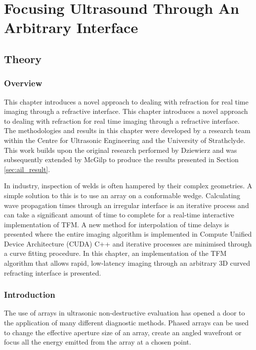 

\chapter{Focusing Ultrasound Through An Arbitrary Interface}\label{chap:cuetfm}

\graphicspath{{cueTFM/Images/}}

\section{Theory}
\subsection{Overview}
This chapter introduces a novel approach to dealing with refraction for real time imaging through a refractive interface. This chapter introduces a novel approach to dealing with refraction for real time imaging through a refractive interface. The methodologies and results in this chapter were developed by a research team within the Centre for Ultrasonic Engineering and the University of Strathclyde. This work builds upon the original research performed by Dziewierz\cite{dziewierz_2d_2015} and was subsequently extended by McGilp\cite{mcgilp_adaptation_2016} to produce the results presented in Section \ref{sec:ail_result}.

In industry, inspection of welds is often hampered by their complex geometries. A simple solution to this is to use an array on a conformable wedge\cite{russell_development_2010}. Calculating wave propagation times through an irregular interface is an iterative process and can take a significant amount of time to complete for a real-time interactive implementation of TFM. A new method for interpolation of time delays is presented where the entire imaging algorithm is implemented in Compute Unified Device Architecture (CUDA) C++ and iterative processes are minimised through a curve fitting procedure. In this chapter, an implementation of the TFM algorithm that allows rapid, low-latency imaging through an arbitrary 3D curved refracting interface is presented. 

\subsection{Introduction}

The use of arrays in ultrasonic non-destructive evaluation has opened a door to the application of many different diagnostic methods. Phased arrays can be used to change the effective aperture size of an array, create an angled wavefront or focus all the energy emitted from the array at a chosen point.

